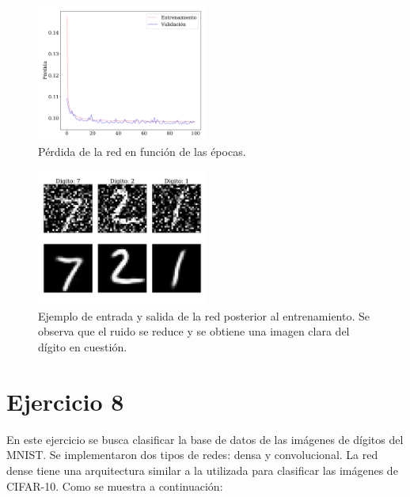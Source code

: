     \begin{figure}[H]
        \begin{small}
            \begin{center}
                \includegraphics[width=0.5\textwidth]{Graphs/ejer7_loss.pdf}
            \end{center}
            \caption{Pérdida de la red en función de las épocas. }
            \label{fig:ejer7_loss}
        \end{small}
    \end{figure}


    \begin{figure}[H]
        \begin{small}
            \begin{center}
                \includegraphics[width=0.5\textwidth]{Graphs/ejer7.pdf}
            \end{center}
            \caption{Ejemplo de entrada y salida de la red posterior al entrenamiento. Se observa que el ruido se reduce y se obtiene una imagen clara del dígito en cuestión.}
            \label{fig:ejer7}
        \end{small}
    \end{figure}


\section*{Ejercicio 8}

    En este ejercicio se busca clasificar la base de datos de las imágenes de dígitos del MNIST. Se implementaron dos tipos de redes: densa y convolucional. La red dense tiene una arquitectura similar a la utilizada para clasificar las imágenes de CIFAR-10. Como se muestra a continuación:

